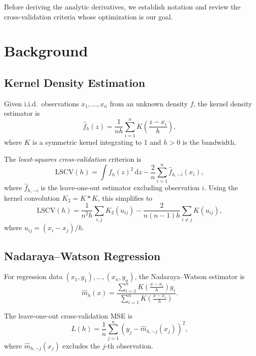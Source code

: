 \documentclass[11pt]{article}
\theoremstyle{definition}
\theoremstyle{remark}
\newcommand{\dd}{\mathrm{d}}
\begin{document}
Before deriving the analytic derivatives, we establish notation and review the cross-validation criteria whose optimization is our goal.

\section{Background}
\label{sec:background}

\subsection{Kernel Density Estimation}

Given i.i.d.\ observations $x_1, \ldots, x_n$ from an unknown density $f$, the kernel density estimator is
\begin{equation}
    \hat{f}_h(z) = \frac{1}{nh} \sum_{i=1}^{n} K\left( \frac{z - x_i}{h} \right),
\end{equation}
where $K$ is a symmetric kernel integrating to 1 and $h > 0$ is the bandwidth.

The \emph{least-squares cross-validation} criterion \citep{rudemo1982empirical,bowman1984alternative} is
\begin{equation}
    \mathrm{LSCV}(h) = \int \hat{f}_h(z)^2 \, \dd z - \frac{2}{n} \sum_{i=1}^{n} \hat{f}_{h,-i}(x_i),
\end{equation}
where $\hat{f}_{h,-i}$ is the leave-one-out estimator excluding observation $i$.
Using the kernel convolution $K_2 = K * K$, this simplifies to
\begin{equation}
    \mathrm{LSCV}(h) = \frac{1}{n^2 h} \sum_{i,j} K_2(u_{ij}) - \frac{2}{n(n-1)h} \sum_{i \neq j} K(u_{ij}),
    \label{eq:lscv}
\end{equation}
where $u_{ij} = (x_i - x_j)/h$.

\subsection{Nadaraya--Watson Regression}

For regression data $(x_1, y_1), \ldots, (x_n, y_n)$, the Nadaraya--Watson estimator is
\begin{equation}
    \hat{m}_h(x) = \frac{\sum_{i=1}^{n} K\left( \frac{x - x_i}{h} \right) y_i}{\sum_{i=1}^{n} K\left( \frac{x - x_i}{h} \right)}.
\end{equation}

The leave-one-out cross-validation MSE is
\begin{equation}
    L(h) = \frac{1}{n} \sum_{j=1}^{n} \left( y_j - \hat{m}_{h,-j}(x_j) \right)^2,
    \label{eq:loocv}
\end{equation}
where $\hat{m}_{h,-j}(x_j)$ excludes the $j$-th observation.
\end{document}
